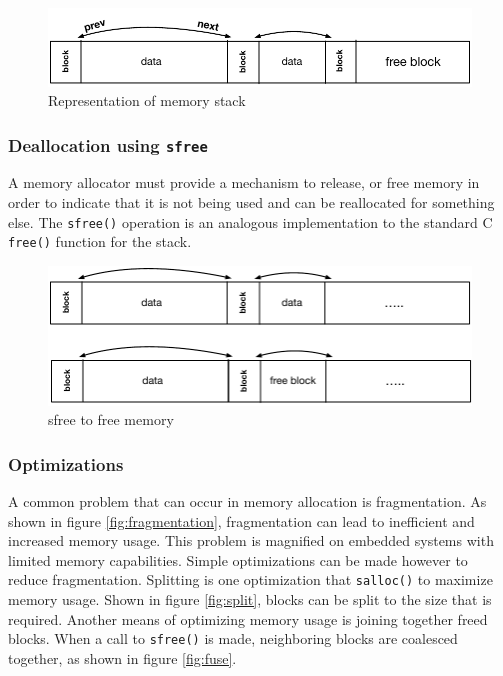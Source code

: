 \begin{figure}[!htb]
\centering
\includegraphics[scale=.55]{figs/stack.pdf}
\caption{Representation of memory stack}
\end{figure}
\label{fig:stack}

\subsubsection{Deallocation using \texttt{sfree}}

A memory allocator must provide a mechanism to release, or free memory in order to indicate that it is not being used and can be reallocated for something else. The \texttt{sfree()} operation is an analogous implementation to the standard C \texttt{free()} function for the stack.

\begin{figure}[!htb]
\centering
\includegraphics[scale=.55]{figs/sfree.pdf}
\caption{sfree to free memory}
\end{figure}
\label{fig:free}
 
\subsubsection{Optimizations}

A common problem that can occur in memory allocation is fragmentation.  As shown in figure \ref{fig:fragmentation}, fragmentation can lead to inefficient and increased memory usage. This problem is magnified on embedded systems with limited memory capabilities. Simple optimizations can be made however to reduce fragmentation. Splitting is one optimization that \texttt{salloc()} to maximize memory usage. Shown in figure \ref{fig:split}, blocks can be split to the size that is required. Another means of optimizing memory usage is joining together freed blocks. When a call to \texttt{sfree()} is made, neighboring blocks are coalesced together, as shown in figure \ref{fig:fuse}.

